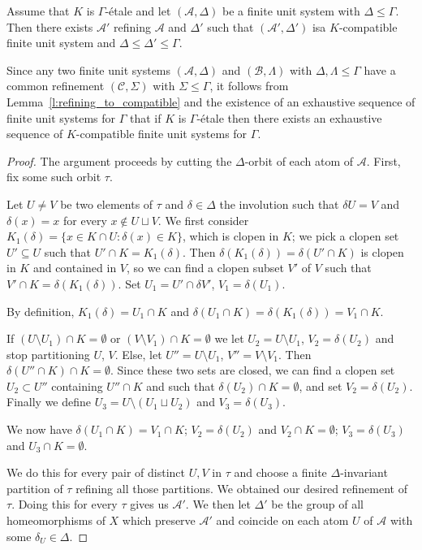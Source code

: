 \documentclass[AHL,Unicode]{cedram}
\newcommand{\mcA}{\mathcal{A}}
\newcommand{\mcB}{\mathcal{B}}
\newcommand{\mcC}{\mathcal{C}}
\begin{document}
\begin{lemm}\label{l:refining_to_compatible}
Assume that $K$ is $\Gamma$-étale and let $(\mcA,\Delta)$ be a finite unit system with $\Delta \le \Gamma$. Then there exists $\mcA'$ refining $\mcA$ and $\Delta'$ such that $(\mcA',\Delta')$ is\linebreak a $K$-compatible finite unit system and $\Delta \le \Delta' \le \Gamma$.
\end{lemm}

Since any two finite unit systems $(\mcA,\Delta)$ and $(\mcB,\Lambda)$ with $\Delta, \Lambda \le \Gamma$ have a common refinement $(\mcC,\Sigma)$ with $\Sigma \le \Gamma$, it follows from Lemma~\ref{l:refining_to_compatible} and the existence of an exhaustive sequence of finite unit systems for $\Gamma$ that if $K$ is $\Gamma$-étale then there exists an exhaustive sequence of $K$-compatible finite unit systems for $\Gamma$.

\begin{proof}
The argument proceeds by cutting the $\Delta$-orbit of each atom of $\mcA$. First, fix some such orbit $\tau$.

Let $U \ne V$ be two elements of $\tau$ and $\delta \in \Delta$ the involution such that $\delta U=V$ and $\delta(x)=x$ for every $x \not \in U \sqcup V$. We first consider $K_1(\delta) = \{x \in K \cap U : \delta(x) \in K\}$, which is clopen in $K$; we pick a clopen set $U' \subseteq U$ such that $U' \cap K=K_1(\delta)$. Then $\delta(K_1(\delta))=\delta(U' \cap K)$ is clopen in $K$ and contained in $V$, so we can find a clopen subset $V'$ of $V$ such that $V' \cap K= \delta(K_1(\delta))$. Set $U_1 = U' \cap \delta V'$, $V_1= \delta (U_1)$.

By definition, $K_1(\delta)= U_1 \cap K$ and $\delta(U_1 \cap K)= \delta(K_1(\delta))=V_1 \cap K$.

If $(U \setminus U_1) \cap K= \emptyset$ or $(V \setminus V_1) \cap K= \emptyset$ we let $U_2=U \setminus U_1$, $V_2=\delta(U_2)$ and stop partitioning $U$, $V$. Else, let $U''=U \setminus U_1$, $V''=V \setminus V_1$. Then $\delta(U'' \cap K) \cap K=\emptyset$. Since these two sets are closed, we can find a clopen set $U_2 \subset U''$ containing $U'' \cap K$ and such that $\delta(U_2) \cap K= \emptyset$, and set $V_2= \delta(U_2)$. Finally we define $U_3= U \setminus (U_1 \sqcup U_2)$ and $V_3=\delta(U_3)$.

We now have $\delta(U_1 \cap K)= V_1 \cap K$; $V_2=\delta(U_2)$ and $V_2 \cap K=\emptyset$; $V_3=\delta(U_3)$ and $U_3 \cap K=\emptyset$.

We do this for every pair of distinct $U,V$ in $\tau$ and choose a finite $\Delta$-invariant partition of $\tau$ refining all those partitions. We obtained our desired refinement of $\tau$. Doing this for every $\tau$ gives us $\mcA'$. We then let $\Delta'$ be the group of all homeomorphisms of $X$ which preserve $\mcA'$ and coincide on each atom $U$ of $\mcA$ with some $\delta_U \in \Delta$.
\end{proof}
\end{document}
